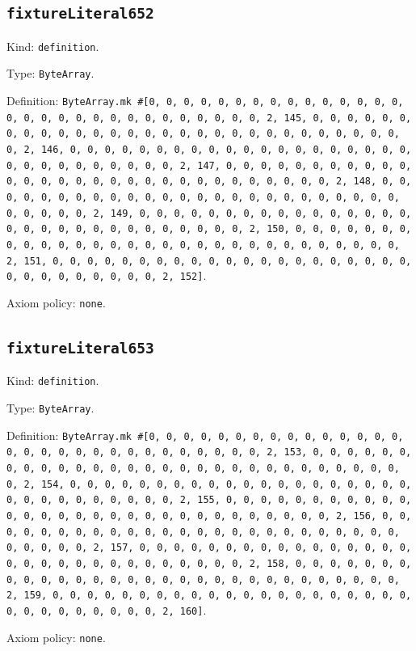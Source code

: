 \documentclass[11pt]{article}
\begin{document}
\subsection*{\texttt{fixtureLiteral652}}
\noindent Kind: \texttt{definition}.\par
\noindent Type: \texttt{ByteArray}.\par
\noindent Definition: \texttt{ByteArray.mk \#[0, 0, 0, 0, 0, 0, 0, 0, 0, 0, 0, 0, 0, 0, 0, 0, 0, 0, 0, 0, 0, 0, 0, 0, 0, 0, 0, 0, 0, 0, 2, 145, 0, 0, 0, 0, 0, 0, 0, 0, 0, 0, 0, 0, 0, 0, 0, 0, 0, 0, 0, 0, 0, 0, 0, 0, 0, 0, 0, 0, 0, 0, 2, 146, 0, 0, 0, 0, 0, 0, 0, 0, 0, 0, 0, 0, 0, 0, 0, 0, 0, 0, 0, 0, 0, 0, 0, 0, 0, 0, 0, 0, 0, 0, 2, 147, 0, 0, 0, 0, 0, 0, 0, 0, 0, 0, 0, 0, 0, 0, 0, 0, 0, 0, 0, 0, 0, 0, 0, 0, 0, 0, 0, 0, 0, 0, 2, 148, 0, 0, 0, 0, 0, 0, 0, 0, 0, 0, 0, 0, 0, 0, 0, 0, 0, 0, 0, 0, 0, 0, 0, 0, 0, 0, 0, 0, 0, 0, 2, 149, 0, 0, 0, 0, 0, 0, 0, 0, 0, 0, 0, 0, 0, 0, 0, 0, 0, 0, 0, 0, 0, 0, 0, 0, 0, 0, 0, 0, 0, 0, 2, 150, 0, 0, 0, 0, 0, 0, 0, 0, 0, 0, 0, 0, 0, 0, 0, 0, 0, 0, 0, 0, 0, 0, 0, 0, 0, 0, 0, 0, 0, 0, 2, 151, 0, 0, 0, 0, 0, 0, 0, 0, 0, 0, 0, 0, 0, 0, 0, 0, 0, 0, 0, 0, 0, 0, 0, 0, 0, 0, 0, 0, 0, 0, 2, 152]}.\par
\noindent Axiom policy: \texttt{none}.\par
\subsection*{\texttt{fixtureLiteral653}}
\noindent Kind: \texttt{definition}.\par
\noindent Type: \texttt{ByteArray}.\par
\noindent Definition: \texttt{ByteArray.mk \#[0, 0, 0, 0, 0, 0, 0, 0, 0, 0, 0, 0, 0, 0, 0, 0, 0, 0, 0, 0, 0, 0, 0, 0, 0, 0, 0, 0, 0, 0, 2, 153, 0, 0, 0, 0, 0, 0, 0, 0, 0, 0, 0, 0, 0, 0, 0, 0, 0, 0, 0, 0, 0, 0, 0, 0, 0, 0, 0, 0, 0, 0, 2, 154, 0, 0, 0, 0, 0, 0, 0, 0, 0, 0, 0, 0, 0, 0, 0, 0, 0, 0, 0, 0, 0, 0, 0, 0, 0, 0, 0, 0, 0, 0, 2, 155, 0, 0, 0, 0, 0, 0, 0, 0, 0, 0, 0, 0, 0, 0, 0, 0, 0, 0, 0, 0, 0, 0, 0, 0, 0, 0, 0, 0, 0, 0, 2, 156, 0, 0, 0, 0, 0, 0, 0, 0, 0, 0, 0, 0, 0, 0, 0, 0, 0, 0, 0, 0, 0, 0, 0, 0, 0, 0, 0, 0, 0, 0, 2, 157, 0, 0, 0, 0, 0, 0, 0, 0, 0, 0, 0, 0, 0, 0, 0, 0, 0, 0, 0, 0, 0, 0, 0, 0, 0, 0, 0, 0, 0, 0, 2, 158, 0, 0, 0, 0, 0, 0, 0, 0, 0, 0, 0, 0, 0, 0, 0, 0, 0, 0, 0, 0, 0, 0, 0, 0, 0, 0, 0, 0, 0, 0, 2, 159, 0, 0, 0, 0, 0, 0, 0, 0, 0, 0, 0, 0, 0, 0, 0, 0, 0, 0, 0, 0, 0, 0, 0, 0, 0, 0, 0, 0, 0, 0, 2, 160]}.\par
\noindent Axiom policy: \texttt{none}.\par
\end{document}
